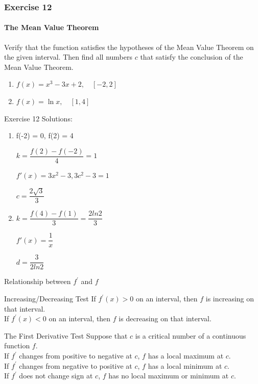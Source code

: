 \documentclass{beamer}
\begin{document}
\begin{frame}
\frametitle{Exercise 12}
\framesubtitle{The Mean Value Theorem}
    Verify that the function satisfies the hypotheses of the Mean Value Theorem on the given interval. Then find all numbers $c$ that satisfy the conclusion of the Mean Value Theorem.
\begin{enumerate}
\item $f(x)=x^{3}-3 x+2, \quad[-2,2]$
\item $f(x)=\ln x, \quad[1,4]$
\end{enumerate}
\end{frame}

\begin{frame}{Exercise 12}
Solutions:
\begin{enumerate}
    \item f(-2) = 0, f(2) = 4
    
    $k = \dfrac{f(2) - f(-2)}{4} = 1$
    
    $f'(x) = 3x^2 - 3, 3c^2 - 3 = 1$
    
    $c = \dfrac{2\sqrt{3}}{3}$
    \item 
    $k = \dfrac{f(4) - f(1)}{3} = \dfrac{2ln2}{3}$
    
    $f'(x) = \dfrac{1}{x}$
    
    $d = \dfrac{3}{2ln2}$
    
\end{enumerate}
\end{frame}



\begin{frame}{Relationship between $f^\prime$ and $f$}
    \begin{block}{Increasing/Decreasing Test}
        If $f^\prime(x)>0$ on an interval, then $f$ is increasing on that interval.\\
        If $f^\prime(x)<0$ on an interval, then $f$ is decreasing on that interval.\\
    \end{block}
    \begin{block}{The First Derivative Test}
        Suppose that $c$ is a critical number of a continuous function $f$.\\
        If $f^\prime$ changes from positive to negative at $c$, $f$ has a local maximum at $c$.\\
        If $f^\prime$ changes from negative to positive at $c$, $f$ has a local minimum at $c$.\\
        If $f^\prime$ does not change sign at $c$, $f$ has no local maximum or minimum at $c$.
    \end{block}
\end{frame}
\end{document}
